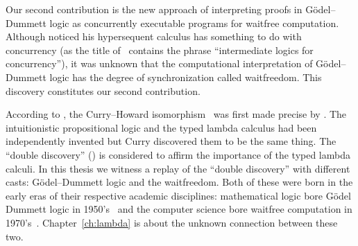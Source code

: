 Our second contribution is the new approach of interpreting proofs in
G\"odel--Dummett logic as
concurrently executable programs for waitfree computation.
Although \citet{avron91} noticed his hypersequent calculus has something
to do with concurrency (as the title of~\citep{avron91} contains the phrase
``intermediate logics for concurrency''), it was unknown that
the computational interpretation of G\"odel--Dummett logic has
the degree of synchronization called waitfreedom.  This discovery
constitutes our second contribution.

According to \citet[p.97]{curryhoward},
the Curry--Howard isomorphism~\citep{curryhoward} was first made
precise by \citet[\textbf{9}E and
\textbf{9}F]{curry1974combinatory}.
The intuitionistic propositional logic and the typed lambda calculus
had been independently invented but Curry discovered them to be the same thing.
The ``double discovery'' (\citet{wadler2012propositions}) is considered
to affirm the importance of the typed lambda calculi.
In this thesis we witness a replay of the ``double discovery'' with
different casts: G\"odel--Dummett logic and the waitfreedom.
Both of these were born in the early eras of their respective academic
disciplines:
mathematical logic bore G\"odel Dummett logic in
1950's~\citep{dummett59}
and the computer science bore waitfree computation in
1970's~\citep{lamport1979make}.
Chapter~\ref{ch:lambda} is about the unknown connection between these two.

